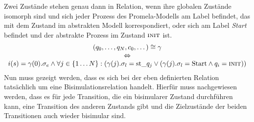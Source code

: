 Zwei Zustände stehen genau dann in Relation, wenn ihre globalen Zustände isomorph sind und sich jeder Prozess des Promela-Modells am Label befindet, das mit dem Zustand im abstrakten Modell korrespondiert, oder sich am Label \emph{Start} befindet und der abstrakte Prozess im Zustand $\textnormal{\scshape init}$ ist.
\[
\begin{array}{c}
  (q_0,\dots,q_N,c_0,\dots)\cong \gamma\\
  \Leftrightarrow\\
  i(s)=\gamma(0).\sigma_e \land \forall j\in\{1\dots N\}: (\gamma(j).\sigma_l = \textrm{st\_}q_j \lor (\gamma(j).\sigma_l = \textrm{Start}\land q_i=\const{init}))
\end{array}
\]
Nun muss gezeigt werden, dass es sich bei der eben definierten Relation tatsächlich um eine Bisimulationsrelation handelt.
Hierfür muss nachgewiesen werden, dass es für jede Transition, die ein bisimularer Zustand durchführen kann, eine Transition des anderen Zustands gibt und die Zielzustände der beiden Transitionen auch wieder bisimular sind.

